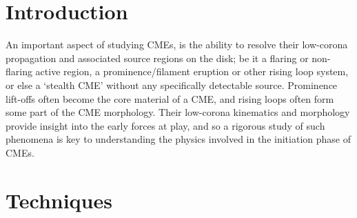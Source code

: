 \documentclass[preprint2]{aastex}
\begin{document}

\section{Introduction}

An important aspect of studying CMEs, is the ability to resolve their low-corona propagation and associated source regions on the disk; be it a flaring or non-flaring active region, a prominence/filament eruption or other rising loop system, or else a `stealth CME' without any specifically detectable source. Prominence lift-offs often become the core material of a CME, and rising loops often form some part of the CME morphology. Their low-corona kinematics and morphology provide insight into the early forces at play, and so a rigorous study of such phenomena is key to understanding the physics involved in the initiation phase of CMEs.

\section{Techniques}

\end{document}
